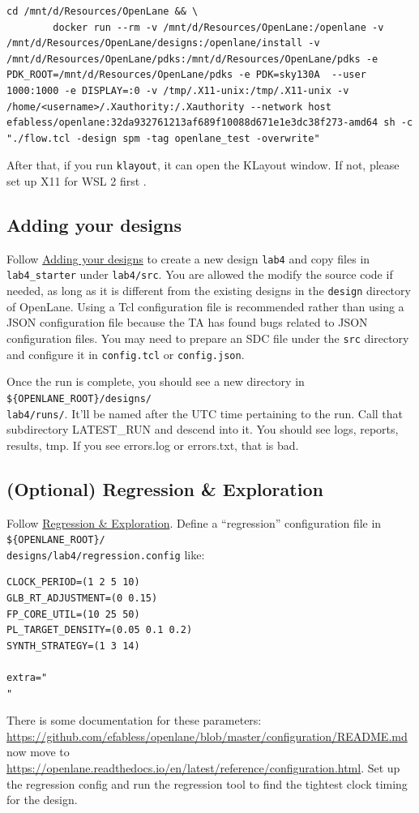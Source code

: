 \documentclass[a4paper,12pt,twoside]{article}
\begin{document}
\begin{verbatim}
cd /mnt/d/Resources/OpenLane && \
        docker run --rm -v /mnt/d/Resources/OpenLane:/openlane -v /mnt/d/Resources/OpenLane/designs:/openlane/install -v /mnt/d/Resources/OpenLane/pdks:/mnt/d/Resources/OpenLane/pdks -e PDK_ROOT=/mnt/d/Resources/OpenLane/pdks -e PDK=sky130A  --user 1000:1000 -e DISPLAY=:0 -v /tmp/.X11-unix:/tmp/.X11-unix -v /home/<username>/.Xauthority:/.Xauthority --network host efabless/openlane:32da932761213af689f10088d671e1e3dc38f273-amd64 sh -c "./flow.tcl -design spm -tag openlane_test -overwrite"
\end{verbatim}
After that, if you run \texttt{klayout}, it can open the KLayout window. If not, please set up X11 for WSL 2 first \cite{wslgui}.
\subsection{Adding your designs}\label{SAdd}
Follow \href{https://openlane.readthedocs.io/en/latest/usage/designs.html}{Adding your designs} to create a new design \texttt{lab4} and copy files in \texttt{lab4\_starter} under \texttt{lab4/src}. You are allowed the modify the source code if needed, as long as it is different from the existing designs in the \texttt{design} directory of OpenLane. Using a Tcl configuration file is recommended rather than using a JSON configuration file because the TA has found bugs related to JSON configuration files. You may need to prepare an SDC file under the \texttt{src} directory and configure it in \texttt{config.tcl} or \texttt{config.json}.

Once the run is complete, you should see a new directory in \verb|${OPENLANE_ROOT}/designs/|\\
\texttt{lab4/runs/}. It’ll be named after the UTC time pertaining to the run. Call that subdirectory LATEST\_RUN and descend into it. You should see logs, reports, results, tmp. If you see errors.log or errors.txt, that is bad.
\subsection{(Optional) Regression \& Exploration}\label{SOptReg}
Follow \href{https://openlane.readthedocs.io/en/latest/usage/exploration_script.html}{Regression \& Exploration}. Define a “regression” configuration file in \verb|${OPENLANE_ROOT}/|\\
\texttt{designs/lab4/regression.config} like:
\begin{verbatim}
CLOCK_PERIOD=(1 2 5 10)
GLB_RT_ADJUSTMENT=(0 0.15)
FP_CORE_UTIL=(10 25 50)
PL_TARGET_DENSITY=(0.05 0.1 0.2)
SYNTH_STRATEGY=(1 3 14)

extra="
"
\end{verbatim}
There is some documentation for these parameters: \url{https://github.com/efabless/openlane/blob/master/configuration/README.md} now move to \url{https://openlane.readthedocs.io/en/latest/reference/configuration.html}. Set up the regression config and run the regression tool to find the tightest clock timing for the design.
\end{document}
